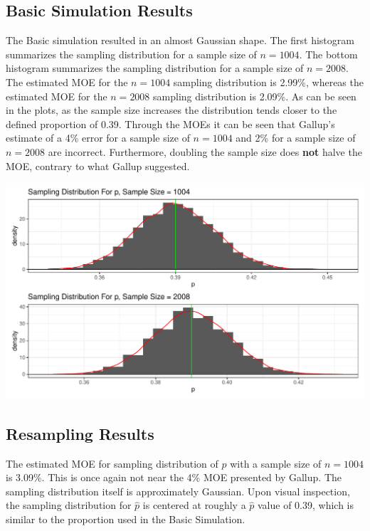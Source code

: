 \documentclass{article}\usepackage[]{graphicx}\usepackage[]{xcolor}
\newenvironment{Figure}
  {\par\medskip\noindent\minipage{\linewidth}}
  {\endminipage\par\medskip}
\begin{document}
\begin{multicols}{2}
\subsection{Basic Simulation Results}
The Basic simulation resulted in an almost Gaussian shape. The first histogram summarizes the sampling distribution for a sample size of $n = 1004$. The bottom histogram summarizes the sampling distribution for a sample size of $n = 2008$. The estimated MOE for the $n = 1004$ sampling distribution is 2.99\%, whereas the estimated MOE for the $n = 2008$ sampling distribution is 2.09\%. As can be seen in the plots, as the sample size increases the distribution tends closer to the defined proportion of 0.39. Through the MOEs it can be seen that Gallup's estimate of a 4\% error for a sample size of $n = 1004$ and 2\% for a sample size of $n = 2008$ are incorrect. Furthermore, doubling the sample size does \textbf{not} halve the MOE, contrary to what Gallup suggested. 

\begin{Figure}
\includegraphics[scale=0.4]{Rplot.pdf}
\label{plot1}
\end{Figure}

\subsection{Resampling Results}
The estimated MOE for sampling distribution of $\hat{p}$ with a sample size of $n = 1004$ is 3.09\%. This is once again not near the 4\% MOE presented by Gallup. The sampling distribution itself is approximately Gaussian. Upon visual inspection, the sampling distribution for $\hat{p}$ is centered at roughly a $\hat{p}$ value of 0.39, which is similar to the proportion used in the Basic Simulation.


\end{multicols}
\end{document}
